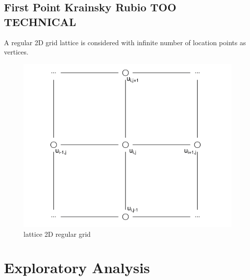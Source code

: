 \documentclass[
  12pt,
  a4paper,
  oneside]{book}
\theoremstyle{definition}
\theoremstyle{definition}
\theoremstyle{definition}
\theoremstyle{remark}
\begin{document}
\hypertarget{first-point-krainsky-rubio-too-technical}{%
\section{First Point Krainsky Rubio TOO TECHNICAL}\label{first-point-krainsky-rubio-too-technical}}

A regular 2D grid lattice is considered with infinite number of location points as vertices.

\begin{figure}
\centering
\includegraphics{images/lattice.png}
\caption{lattice 2D regular grid}
\end{figure}

\hypertarget{exploratory}{%
\chapter{Exploratory Analysis}\label{exploratory}}
\end{document}

